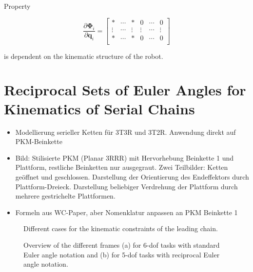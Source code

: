 \documentclass[robotics,article,submit,moreauthors,pdftex]{Definitions/mdpi}
\newcommand{\bm}[1]{\boldsymbol{#1}}
\begin{document}
Property

\begin{equation}
\frac{\partial \bm{\Phi}_i}{\partial \bm{q}_i}
=
\begin{bmatrix}
* & \cdots & * & 0 & \cdots & 0\\
\vdots &  \cdots & \vdots & \vdots & \cdots & \vdots \\
* & \cdots & * & 0 & \cdots & 0\\
\end{bmatrix}
\label{equ:PKM_phi_grad_q_form}
\end{equation}

is dependent on the kinematic structure of the robot.

\section{Reciprocal Sets of Euler Angles for Kinematics of Serial Chains}
\label{sec:REW_seriell}

\cite{1_SchapplerTapOrt2019}

\begin{itemize}
    \item Modellierung serieller Ketten für 3T3R und 3T2R. Anwendung direkt auf PKM-Beinkette
    \item Bild: Stilisierte PKM (Planar 3RRR) mit Hervorhebung Beinkette 1 und Plattform, restliche Beinketten nur ausgegraut. Zwei Teilbilder: Ketten geöffnet und geschlossen. Darstellung der Orientierung des Endeffektors durch Plattform-Dreieck. Darstellung beliebiger Verdrehung der Plattform durch mehrere gestrichelte Plattformen.
    \item Formeln aus WC-Paper, aber Nomenklatur anpassen an PKM Beinkette 1
\end{itemize}


\begin{figure}[tb]
    
    \caption{Different cases for the kinematic constraints of the leading chain.}
    \label{fig:pkm_constr_rot_lead}
\end{figure} 


\begin{figure}[tb]
    
    \caption{Overview of the different frames (a) for 6-dof tasks with standard Euler angle notation and (b) for 5-dof tasks with reciprocal Euler angle notation.}
    \label{fig:frames_5dof_6dof}
\end{figure} 
\end{document}
